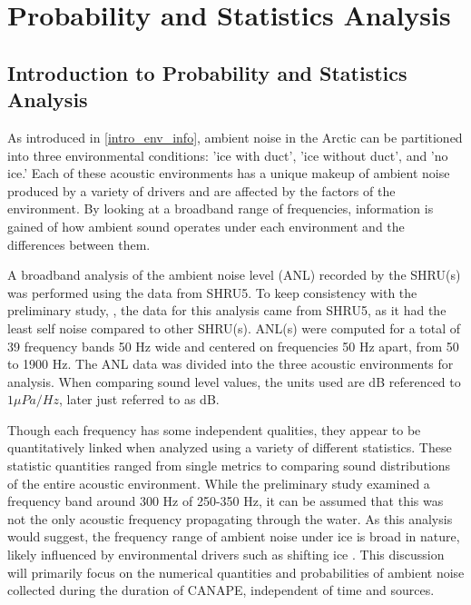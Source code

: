 
\chapter{Probability and Statistics Analysis} \label{sec_probsnstat}


\section{Introduction to Probability and Statistics Analysis} \label{sec_statintro}


As introduced in \autoref{intro_env_info}, ambient noise in the Arctic can be partitioned into three environmental conditions: 'ice with duct', 'ice without duct', and 'no ice.' Each of these acoustic environments has a unique makeup of ambient noise produced by a variety of drivers and are affected by the factors of the environment. By looking at a broadband range of frequencies, information is gained of how ambient sound operates under each environment and the differences between them.  

A broadband analysis of the ambient noise level (ANL) recorded by the SHRU(s) was performed using the data from SHRU5. To keep consistency with the preliminary study, \parencite{Bonnel2021}, the data for this analysis came from SHRU5, as it had the least self noise compared to other SHRU(s). ANL(s) were computed for a total of 39 frequency bands 50 Hz wide and centered on frequencies 50 Hz apart, from 50 to 1900 Hz. The ANL data was divided into the three acoustic environments for analysis. When comparing sound level values, the units used are dB referenced to $1 \mu Pa/Hz $, later just referred to as dB. %

Though each frequency has some independent qualities, they appear to be quantitatively linked when analyzed using a variety of different statistics. These statistic quantities ranged from single metrics to comparing sound distributions of the entire acoustic environment. While the preliminary study \parencite{Bonnel2021} examined a frequency band around 300 Hz of 250-350 Hz, it can be assumed that this was not the only acoustic frequency propagating through the water. As this analysis would suggest, the frequency range of ambient noise under ice is broad in nature, likely influenced by environmental drivers such as shifting ice \parencite{kinda2015arctic}. This discussion will primarily focus on the numerical quantities and probabilities of ambient noise collected during the duration of CANAPE, independent of time and sources.



